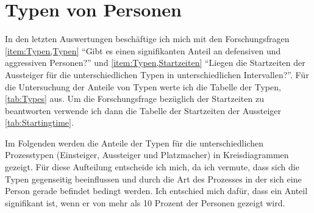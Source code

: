 \section{Typen von Personen} \label{Typen}
In den letzten Auswertungen beschäftige ich mich mit den Forschungsfragen \ref{item:Typen,Typen} "`Gibt es einen signifikanten Anteil an defensiven und aggressiven Personen?"' und \ref{item:Typen,Startzeiten} "`Liegen die Startzeiten der Aussteiger für die unterschiedlichen Typen in unterschiedlichen Intervallen?"'. Für die Untersuchung der Anteile von Typen werte ich die Tabelle der Typen, \tablename \ref{tab:Types} aus. Um die Forschungsfrage bezüglich der Startzeiten zu beantworten verwende ich dann die Tabelle der Startzeiten der Aussteiger \tablename \ref{tab:Startingtime}.

Im Folgenden werden die Anteile der Typen für die unterschiedlichen Prozesstypen (Einsteiger, Aussteiger und Platzmacher) in Kreisdiagrammen gezeigt. Für diese Aufteilung entscheide ich mich, da ich vermute, dass sich die Typen gegenseitig beeinflussen und durch die Art des Prozesses in der sich eine Person gerade befindet bedingt werden. Ich entschied mich dafür, dass ein Anteil signifikant ist, wenn er von mehr als 10 Prozent der Personen gezeigt wird.

